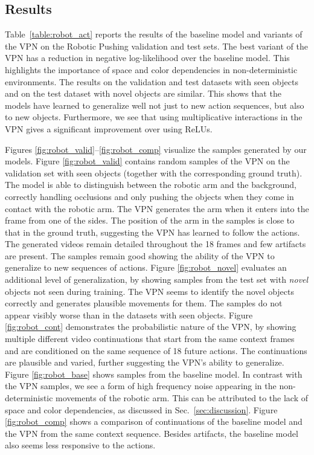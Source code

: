 \documentclass{article}
\begin{document}
\subsection{Results}

Table~\ref{table:robot_act} reports the results of the baseline model and variants of the VPN on the Robotic Pushing validation and test sets. The best variant of the VPN has a  reduction in negative log-likelihood over the baseline model. This highlights the importance of space and color dependencies in non-deterministic environments. The results on the validation and test datasets with seen objects and on the test dataset with novel objects are similar. This shows that the models have learned to generalize well not just to new action sequences, but also to new objects. Furthermore, we see that using multiplicative interactions in the VPN gives a significant improvement over using ReLUs.

Figures \ref{fig:robot_valid}--\ref{fig:robot_comp} visualize the samples generated by our models. Figure \ref{fig:robot_valid} contains random samples of the VPN on the validation set with seen objects (together with the corresponding ground truth). The model is able to distinguish between the robotic arm and the background, correctly handling occlusions and only pushing the objects when they come in contact with the robotic arm. The VPN generates the arm when it enters into the frame from one of the sides. The position of the arm in the samples is close to that in the ground truth, suggesting the VPN has learned to follow the actions. The generated videos remain detailed throughout the 18 frames and few artifacts are present.  The samples remain good showing the ability of the VPN to generalize to new sequences of actions.  Figure \ref{fig:robot_novel} evaluates an additional level of generalization, by showing samples from the test set with \emph{novel} objects not seen during training. The VPN seems to identify the novel objects correctly and generates plausible movements for them. The samples do not appear visibly worse than in the datasets with seen objects. Figure \ref{fig:robot_cont} demonstrates the probabilistic nature of the VPN, by showing multiple different video continuations that start from the same context frames and are conditioned on the same sequence of 18 future actions. The continuations are plausible and varied, further suggesting the VPN's ability to generalize. Figure \ref{fig:robot_base} shows samples from the baseline model. In contrast with the VPN samples, we see a form of high frequency noise appearing in the non-deterministic movements of the robotic arm. This can be attributed to the lack of space and color dependencies, as discussed in Sec.~\ref{sec:discussion}. Figure \ref{fig:robot_comp} shows a comparison of continuations of the baseline model and the VPN from the same context sequence. Besides artifacts, the baseline model also seems less responsive to the actions.
\end{document}
